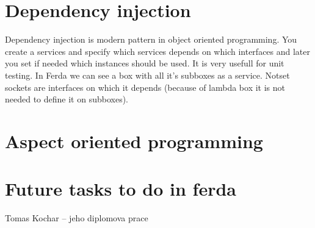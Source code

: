 \documentclass[a4paper,12pt]{book}
\begin{document}
\section{Dependency injection}
Dependency injection is modern pattern in object oriented programming. You create a services and specify which services depends on which interfaces and later you set if needed which instances should be used. It is very usefull for unit testing. In Ferda we can see a box with all it's subboxes as a service. Notset sockets are interfaces on which it depends (because of lambda box it is not needed to define it on subboxes).

\section{Aspect oriented programming}
\section{Future tasks to do in ferda}



\begin{thebibliography}{thesisKuchar}
 Tomas Kochar -- jeho diplomova prace
\end{thebibliography}
\end{document}
